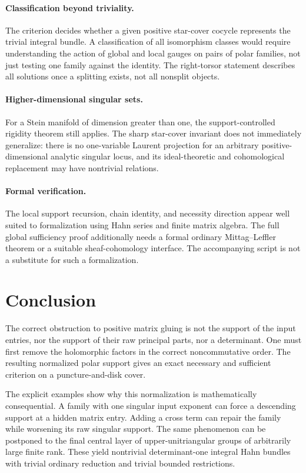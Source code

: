 \documentclass[11pt,letterpaper]{article}
\theoremstyle{definition}
\theoremstyle{remark}
\numberwithin{equation}{section}
\begin{document}
\paragraph{Classification beyond triviality.}
The criterion decides whether a given positive star-cover cocycle represents the trivial integral bundle. A classification of all isomorphism classes would require understanding the action of global and local gauges on pairs of polar families, not just testing one family against the identity. The right-torsor statement describes all solutions once a splitting exists, not all nonsplit objects.

\paragraph{Higher-dimensional singular sets.}
For a Stein manifold of dimension greater than one, the support-controlled rigidity theorem still applies. The sharp star-cover invariant does not immediately generalize: there is no one-variable Laurent projection for an arbitrary positive-dimensional analytic singular locus, and its ideal-theoretic and cohomological replacement may have nontrivial relations.

\paragraph{Formal verification.}
The local support recursion, chain identity, and necessity direction appear well suited to formalization using Hahn series and finite matrix algebra. The full global sufficiency proof additionally needs a formal ordinary Mittag--Leffler theorem or a suitable sheaf-cohomology interface. The accompanying script is not a substitute for such a formalization.

\section{Conclusion}

The correct obstruction to positive matrix gluing is not the support of the input entries, nor the support of their raw principal parts, nor a determinant. One must first remove the holomorphic factors in the correct noncommutative order. The resulting normalized polar support gives an exact necessary and sufficient criterion on a puncture-and-disk cover.

The explicit examples show why this normalization is mathematically consequential. A family with one singular input exponent can force a descending support at a hidden matrix entry. Adding a cross term can repair the family while worsening its raw singular support. The same phenomenon can be postponed to the final central layer of upper-unitriangular groups of arbitrarily large finite rank. These yield nontrivial determinant-one integral Hahn bundles with trivial ordinary reduction and trivial bounded restrictions.
\end{document}
